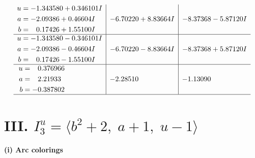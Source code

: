 \documentclass[1p]{elsarticle_modified}
\theoremstyle{definition}
\begin{document}
$$\begin{array}{c|c|c}
\begin{aligned}
u &= -1.343580 + 0.346101 I \\
a &= -2.09386 + 0.46604 I \\
b &= \phantom{-}0.17426 + 1.55100 I\end{aligned}
 & -6.70220 + 8.83664 I & -8.37368 - 5.87120 I \\ \hline\begin{aligned}
u &= -1.343580 - 0.346101 I \\
a &= -2.09386 - 0.46604 I \\
b &= \phantom{-}0.17426 - 1.55100 I\end{aligned}
 & -6.70220 - 8.83664 I & -8.37368 + 5.87120 I \\ \hline\begin{aligned}
u &= \phantom{-}0.376966\phantom{ +0.000000I} \\
a &= \phantom{-}2.21933\phantom{ +0.000000I} \\
b &= -0.387802\phantom{ +0.000000I}\end{aligned}
 & -2.28510\phantom{ +0.000000I} & -1.13090\phantom{ +0.000000I}\\
 \hline 
 \end{array}$$\newpage\newpage\renewcommand{\arraystretch}{1}
\centering \section*{III. $I^u_{3}= \langle b^2+2,\;a+1,\;u-1 \rangle$}
\flushleft \textbf{(i) Arc colorings}\\
\end{document}

